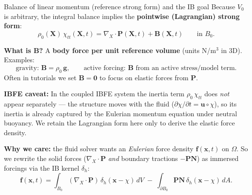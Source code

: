 \documentclass[aspectratio=169]{beamer}
\newcommand{\x}{\bm{x}}
\newcommand{\X}{\bm{X}}
\newcommand{\divX}{\nabla_{\!X}\!\cdot}
\newcommand{\Pten}{\bm{P}}        %
\newcommand{\Nvec}{\bm{N}}       %
\newcommand{\fEuler}{\bm{f}}     %
\newcommand{\uEuler}{\bm{u}}     %
\newcommand{\deltah}{\delta_h}   %
\begin{document}
\begin{frame}{Balance of linear momentum (reference strong form) and the IB goal}
\small
Because \(V_0\) is arbitrary, the integral balance implies the \textbf{pointwise (Lagrangian) strong form}:
\[
\rho_0(\X)\,\chi_{tt}(\X,t)=\divX\Pten(\X,t)+\bm{B}(\X,t)
\qquad \text{in } B_0.
\]

\medskip
\textbf{What is \(\bm{B}\)?}
A \textbf{body force per unit reference volume} (units N/m\(^3\) in 3D). Examples:
\[
\text{gravity: }\bm{B}=\rho_0\,\bm{g},\qquad
\text{active forcing: }\bm{B} \text{ from an active stress/model term.}
\]
Often in tutorials we set \(\bm{B}=\bm{0}\) to focus on elastic forces from \(\Pten\).

\medskip
\textbf{IBFE caveat:} In the coupled IBFE system the inertia term \(\rho_0\,\chi_{tt}\) does \emph{not} appear separately --- the structure moves with the fluid (\(\partial \chi/\partial t = \uEuler\circ\chi\)), so its inertia is already captured by the Eulerian momentum equation under neutral buoyancy. We retain the Lagrangian form here only to derive the elastic force density.

\medskip
\textbf{Why we care:}
the fluid solver wants an \emph{Eulerian} force density \(\fEuler(\x,t)\) on \(\Omega\).
So we rewrite the solid forces (\(\divX\Pten\) \emph{and} boundary tractions \(-\Pten\Nvec\)) as immersed forcings via the IB kernel \(\deltah\):
\[
\fEuler(\x,t)
=\int_{B_0}(\divX\Pten)\,\deltah(\x-\chi)\,dV
\;-\;\int_{\partial B_0}\Pten\Nvec\,\deltah(\x-\chi)\,dA.
\]
\end{frame}





\end{document}
